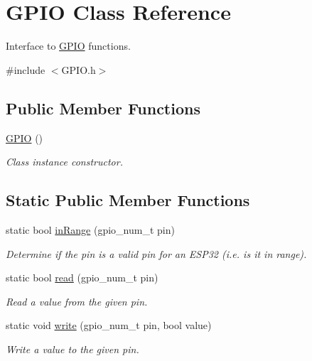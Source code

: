 \hypertarget{class_g_p_i_o}{}\section{G\+P\+IO Class Reference}
\label{class_g_p_i_o}


Interface to \hyperlink{class_g_p_i_o}{G\+P\+IO} functions.  




{\ttfamily \#include $<$G\+P\+I\+O.\+h$>$}

\subsection*{Public Member Functions}
\begin{DoxyCompactItemize}
\item 
\hyperlink{class_g_p_i_o_ab443a641cef81b1a9ec0211c5aa9c1ac}{G\+P\+IO} ()\hypertarget{class_g_p_i_o_ab443a641cef81b1a9ec0211c5aa9c1ac}{}\label{class_g_p_i_o_ab443a641cef81b1a9ec0211c5aa9c1ac}

\begin{DoxyCompactList}\small\item\em Class instance constructor. \end{DoxyCompactList}\end{DoxyCompactItemize}
\subsection*{Static Public Member Functions}
\begin{DoxyCompactItemize}
\item 
static bool \hyperlink{class_g_p_i_o_abf656b90733746f9ea9d159bd763cfc4}{in\+Range} (gpio\+\_\+num\+\_\+t pin)
\begin{DoxyCompactList}\small\item\em Determine if the pin is a valid pin for an E\+S\+P32 (i.\+e. is it in range). \end{DoxyCompactList}\item 
static bool \hyperlink{class_g_p_i_o_a1e27266f9b0a2c2d0f1d50ece418a696}{read} (gpio\+\_\+num\+\_\+t pin)
\begin{DoxyCompactList}\small\item\em Read a value from the given pin. \end{DoxyCompactList}\item 
static void \hyperlink{class_g_p_i_o_aa652e62ca75dd0610f63ad99acc0ebc2}{write} (gpio\+\_\+num\+\_\+t pin, bool value)
\begin{DoxyCompactList}\small\item\em Write a value to the given pin. \end{DoxyCompactList}\end{DoxyCompactItemize}


